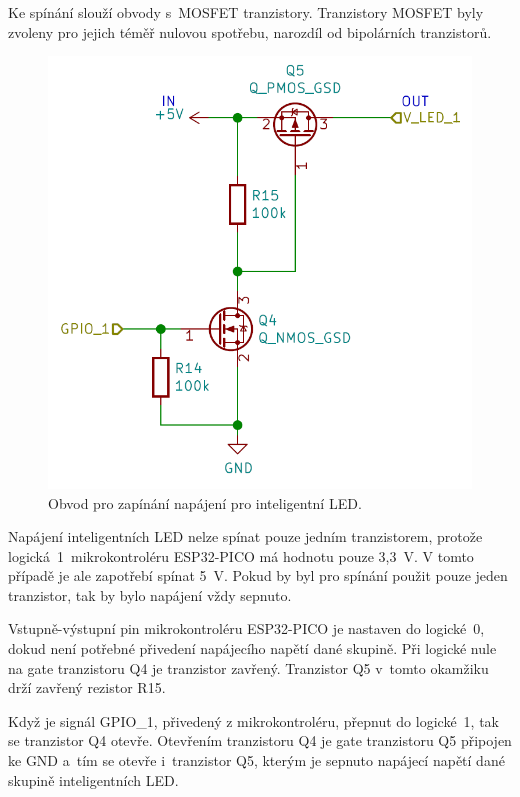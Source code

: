   Ke spínání slouží obvody s~MOSFET tranzistory. Tranzistory MOSFET byly zvoleny pro jejich téměř nulovou spotřebu, narozdíl od 
  bipolárních tranzistorů. 

  \begin{figure}[!h]
    \begin{center}
      \includegraphics[scale=0.45]{obrazky/Zapinani_napajeni_LED.png}
    \end{center}
    \caption[Obvod pro zapínání napájení pro inteligentní LED]{Obvod pro zapínání napájení pro inteligentní LED.}
  \end{figure}

  Napájení inteligentních LED nelze spínat pouze jedním tranzistorem, protože logická~1~mikrokontroléru ESP32-PICO má hodnotu pouze 3,3~V. 
  V tomto případě je ale zapotřebí spínat 5~V. Pokud by byl pro spínání použit pouze jeden tranzistor, tak by bylo napájení vždy sepnuto.

  Vstupně-výstupní pin mikrokontroléru ESP32-PICO je nastaven do logické~0, dokud není potřebné přivedení napájecího napětí dané skupině. 
  Při logické nule na gate 
  tranzistoru Q4 je tranzistor zavřený. Tranzistor Q5 v~tomto okamžiku drží zavřený rezistor R15.

  Když je signál GPIO\_1, přivedený z mikrokontroléru, přepnut do logické~1, tak se tranzistor Q4 otevře. Otevřením tranzistoru Q4 je gate tranzistoru Q5 
  připojen ke GND a~tím se otevře i~tranzistor Q5, kterým je sepnuto napájecí napětí dané skupině inteligentních LED.

